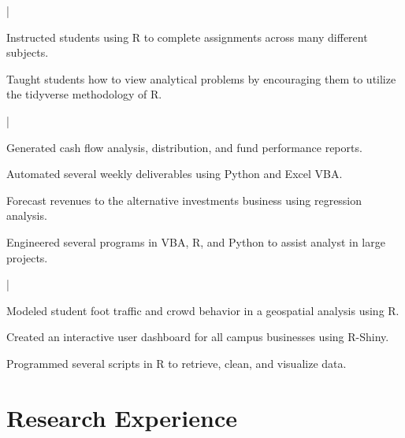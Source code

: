 \documentclass[letterpaper]{deedy-resume}
\begin{document}
\begin{minipage}[t]{0.65\textwidth}
 |
\begin{tightitemize}
  \item Instructed students using R to complete assignments across many different subjects. \\
  \item Taught students how to view analytical problems by encouraging them to utilize the tidyverse methodology of R. \\
\end{tightitemize}

\sectionspace 

 |
\begin{tightitemize}
  \item Generated cash flow analysis, distribution, and fund performance reports.\\
  \item Automated several weekly deliverables using Python and Excel VBA. \\
  \item Forecast revenues to the alternative investments business using regression analysis. \\
  \item Engineered several programs in VBA, R, and Python to assist analyst in large projects.
\end{tightitemize}

\sectionspace 

 |
\begin{tightitemize}
\item Modeled student foot traffic and crowd behavior in a geospatial analysis using R. \\
\item Created an interactive user dashboard for all campus businesses using R-Shiny. \\
\item Programmed several scripts in R to retrieve, clean, and visualize data.
\end{tightitemize}

\sectionspace
    
\section{Research Experience}


\end{minipage}
\end{document}
